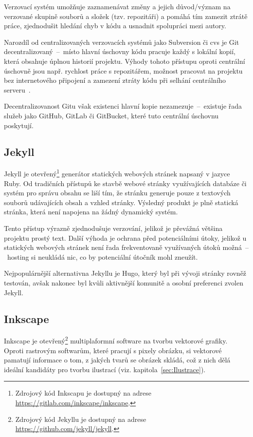 \documentclass[a4paper, 12pt]{article}
\newcommand*{\fullref}[1]{\hyperref[{#1}]{\ref*{#1}}}
\begin{document}
  Verzovací systém umožňuje zaznamenávat změny a jejich důvod/význam na verzované skupině souborů a složek (tzv. repozitáři) a pomáhá tím zamezit ztrátě práce, zjednodušit hledání chyb v kódu a usnadnit spolupráci mezi autory.

  Narozdíl od centralizovaných verzovacích systémů jako Subversion či \gls{cvs} je Git decentralizovaný~--~místo hlavní úschovny kódu pracuje každý s lokální kopií, která obsahuje úplnou historií projektu. Výhody tohoto přístupu oproti centrální úschovně jsou např. rychlost práce s repozitářem, možnost pracovat na projektu bez internetového připojení a zamezení ztráty kódu při selhání centrálního serveru~\cite{cvcs-vs-dvcs}.

  Decentralizovanost Gitu však existenci hlavní kopie nezamezuje~--~existuje řada služeb jako GitHub, GitLab či GitBucket, které tuto centrální úschovnu poskytují.


  \subsection{Jekyll} \label{sec:Jekyll}
  Jekyll je otevřený\footnote{Zdrojový kód Inkscapu je dostupný na adrese \url{https://gitlab.com/inkscape/inkscape}.} generátor statických webových stránek napsaný v jazyce Ruby. Od tradičních přístupů ke stavbě webové stránky využívajících databáze či systém pro správu obsahu se liší tím, že stránku generuje pouze z textových souborů udávajících obsah a vzhled stránky. Výsledný produkt je plně statická stránka, která není napojena na žádný dynamický systém.

  Tento přístup výrazně zjednodušuje verzování, jelikož je převážná většina projektu prostý text. Další výhoda je ochrana před potenciálními útoky, jelikož u statických webových stránek není řada frekventovaně využívaných útoků možná~--~hosting si neukládá nic, co by potenciální útočník mohl zneužít.

  Nejpopulárnější alternativna Jekyllu je Hugo, který byl při vývoji stránky rovněž testován, avšak nakonec byl kvůli aktivnější komunitě a osobní preferenci zvolen Jekyll.


  \subsection{Inkscape} \label{sec:Inkscape}
  Inkscape je otevřený\footnote{Zdrojový kód Jekyllu je dostupný na adrese \url{https://github.com/jekyll/jekyll}.} multiplaformní software na tvorbu vektorové grafiky. Oproti rastrovým softwarům, které pracují s  pixely obrázku, si vektorové pamatují informace o tom, z jakých tvarů se obrázek skládá, což z nich dělá ideální kandidáty pro tvorbu ilustrací (viz. kapitola~\fullref{sec:Ilustrace}).
\end{document}
